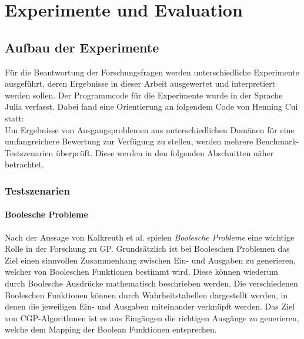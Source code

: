 \chapter{Experimente und Evaluation}
\label{praktischer Teil}

\section{Aufbau der Experimente}
\label{sec:aufbauExperimente}

Für die Beantwortung der Forschungsfragen werden unterschiedliche Experimente ausgeführt, deren Ergebnisse in dieser Arbeit ausgewertet und interpretiert werden sollen.
Der Programmcode für die Experimente wurde in der Sprache Julia verfasst.
Dabei fand eine Orientierung an folgendem Code von Henning Cui statt: \cite{cuihen_cuihencgp_with_crossover_strategies_2024}\\
Um Ergebnisse von Ausgangsproblemen aus unterschiedlichen Domänen für eine umfangreichere Bewertung zur Verfügung zu stellen, werden mehrere Benchmark-Testszenarien überprüft.
Diese werden in den folgenden Abschnitten näher betrachtet.

\subsection{Testszenarien}
\label{subsec:testszenarien}

\subsubsection{Boolesche Probleme}
\label{subsubsec:booleanProblems}

Nach der Aussage von Kalkreuth et al. spielen \emph{Boolesche Probleme} eine wichtige Rolle in der Forschung zu GP.
Grundsätzlich ist bei Booleschen Problemen das Ziel einen sinnvollen Zusammenhang zwischen Ein- und Ausgaben zu generieren, welcher von Booleschen Funktionen bestimmt wird.
Diese können wiederum durch Boolesche Ausdrücke mathematisch beschrieben werden.
Die verschiedenen Booleschen Funktionen können durch Wahrheitstabellen dargestellt werden, in denen die jeweiligen Ein- und Ausgaben miteinander verknüpft werden. \cite{kalkreuth_towards_2023}
Das Ziel von CGP-Algorithmen ist es aus Eingängen die richtigen Ausgänge zu generieren, welche dem Mapping der Boolean Funktionen entsprechen.\\

